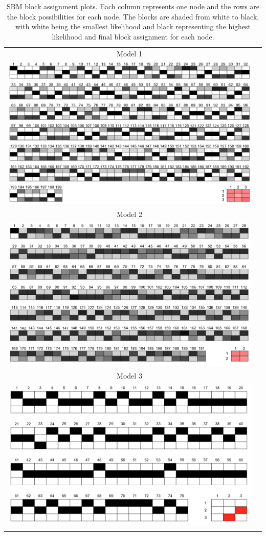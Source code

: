 \documentclass[fleqn,12pt]{wlscirep}
\begin{document}
\clearpage
\begin{longtable}[!h]{c@{\hskip 0cm}c}
Model 1 \\
\includegraphics[height=.29\textheight, clip=true, trim=0cm 0cm 0cm 0cm]{figures/SBM_m1}   \\
Model 2 \\
\includegraphics[height=.29\textheight, clip=true, trim=0cm 0cm 0cm 0cm]{figures/SBM_m2}   \\
Model 3 \\
\includegraphics[height=.25\textheight, clip=true, trim=0cm 0cm 0cm 0cm]{figures/SBM_m3}   \\
\caption{\label{fig:SBM_plot_1} SBM block assignment plots. Each column represents one node and the rows are the block possibilities for each node. The blocks are shaded from white to black, with white being the smallest likelihood and black representing the highest likelihood and final block assignment for each node.}
\end{longtable}





\clearpage



\end{document}
